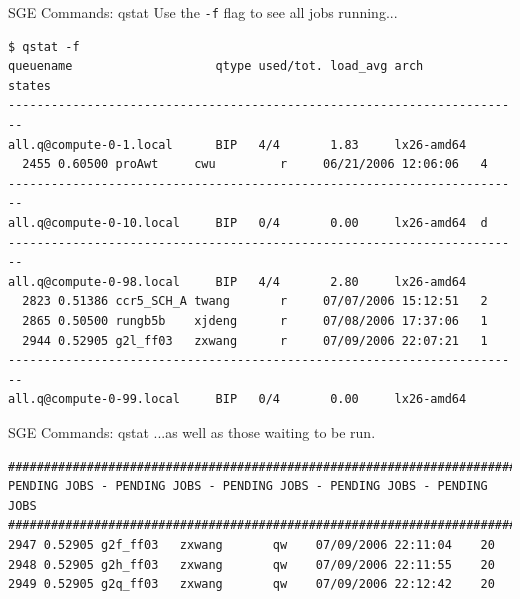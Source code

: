\documentclass[pdf,genome,nocolorBG,slideColor,noaccumulate,nototal]{prosper}
\begin{document}
\begin{slide}{SGE Commands: qstat}
Use the {\tt -f} flag to see all jobs running...
\tiny
\begin{verbatim}
$ qstat -f
queuename                    qtype used/tot. load_avg arch        states
------------------------------------------------------------------------
all.q@compute-0-1.local      BIP   4/4       1.83     lx26-amd64
  2455 0.60500 proAwt     cwu         r     06/21/2006 12:06:06   4
------------------------------------------------------------------------
all.q@compute-0-10.local     BIP   0/4       0.00     lx26-amd64  d
------------------------------------------------------------------------
all.q@compute-0-98.local     BIP   4/4       2.80     lx26-amd64
  2823 0.51386 ccr5_SCH_A twang       r     07/07/2006 15:12:51   2
  2865 0.50500 rungb5b    xjdeng      r     07/08/2006 17:37:06   1
  2944 0.52905 g2l_ff03   zxwang      r     07/09/2006 22:07:21   1
------------------------------------------------------------------------
all.q@compute-0-99.local     BIP   0/4       0.00     lx26-amd64
\end{verbatim}
\end{slide}

\begin{slide}{SGE Commands: qstat}
...as well as those waiting to be run.
\tiny
\begin{verbatim}
########################################################################
PENDING JOBS - PENDING JOBS - PENDING JOBS - PENDING JOBS - PENDING JOBS
########################################################################
2947 0.52905 g2f_ff03   zxwang       qw    07/09/2006 22:11:04    20
2948 0.52905 g2h_ff03   zxwang       qw    07/09/2006 22:11:55    20
2949 0.52905 g2q_ff03   zxwang       qw    07/09/2006 22:12:42    20
\end{verbatim}
\end{slide}
\end{document}
